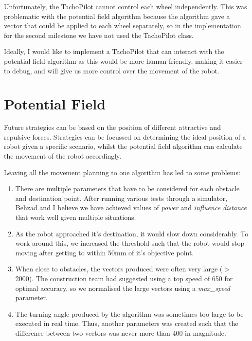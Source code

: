 \documentclass[conference,12pt]{IEEEtran}
\begin{document}
Unfortunately, the TachoPilot cannot control each wheel independently. This was problematic with the potential field algorithm because the algorithm gave a vector that could be applied to each wheel separately, so in the implementation for the second milestone we have not used the TachoPilot class.

Ideally, I would like to implement a TachoPilot that can interact with the potential field algorithm as this would be more human-friendly, making it easier to debug, and will give us more control over the movement of the robot.

\section{Potential Field}
Future strategies can be based on the position of different attractive and repulsive forces. Strategies can be focussed on determining the ideal position of a robot given a specific scenario, whilst the potential field algorithm can calculate the movement of the robot accordingly.

Leaving all the movement planning to one algorithm has led to some problems:
\begin{enumerate}
\item There are multiple parameters that have to be considered for each obstacle and destination point. After running various tests through a simulator, Behzad and I believe we have achieved values of \textit{power} and \textit{influence distance} that work well given multiple situations. 
\item As the robot approached it's destination, it would slow down considerably. To work around this, we increased the threshold such that the robot would stop moving after getting to within 50mm of it's objective point.
\item When close to obstacles, the vectors produced were often very large ($>$2000). The construction team had suggested using a top speed of 650 for optimal accuracy, so we normalised the large vectors using a \textit{max\_speed} parameter.
\item The turning angle produced by the algorithm was sometimes too large to be executed in real time. Thus, another parameters was created such that the difference between two vectors was never more than 400 in magnitude.
\end{enumerate}
	
\end{document}
